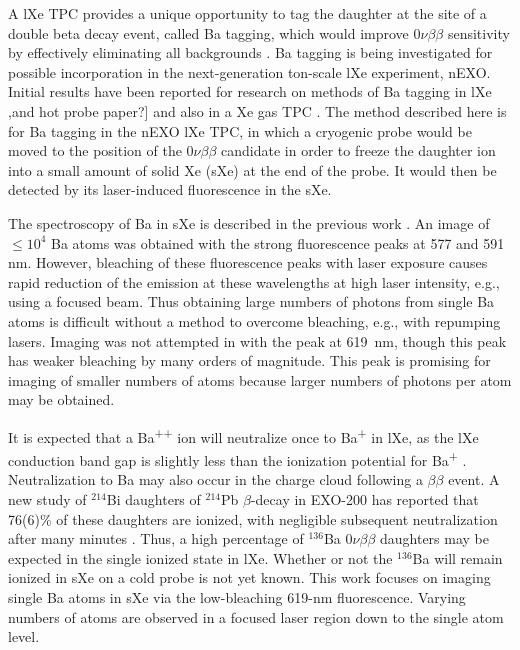 \documentclass[aps,pra,reprint,superscriptaddress]{revtex4-1}
\begin{document}
A lXe TPC provides a unique opportunity to tag the daughter at the site of a double beta decay event, called Ba tagging, which would improve $0\nu\beta\beta$ sensitivity by effectively eliminating all backgrounds \cite{Moe1991}.  Ba tagging is being investigated for possible incorporation in the next-generation ton-scale lXe experiment, nEXO.  Initial results have been reported for research on methods of Ba tagging in lXe \cite{Twelker2014}{\color{gray},and hot probe paper?]} and also in a Xe gas TPC \cite{Brunner2015}.  The method described here is for Ba tagging in the nEXO lXe TPC, in which a cryogenic probe would be moved to the position of the $0\nu\beta\beta$ candidate in order to freeze the daughter ion into a small amount of solid Xe (sXe) at the end of the probe.  It would then be detected by its laser-induced fluorescence in the sXe.

The spectroscopy of Ba in sXe is described in the previous work \cite{Mong2015}.  An image of $\leq 10^4$ Ba atoms was obtained with the strong fluorescence peaks at 577 and 591 nm.  However, bleaching of these fluorescence peaks with laser exposure causes rapid reduction of the emission at these wavelengths at high laser intensity, e.g., using a focused beam.  Thus obtaining large numbers of photons from single Ba atoms is difficult without a method to overcome bleaching, e.g., with repumping lasers.  Imaging was not attempted in \cite{Mong2015} with the peak at 619~nm, though this peak has weaker bleaching by many orders of magnitude.  This peak is promising for imaging of smaller numbers of atoms because larger numbers of photons per atom may be obtained.

It is expected that a Ba\textsuperscript{++} ion will neutralize once to Ba\textsuperscript{+} in lXe, as the lXe conduction band gap is slightly less than the ionization potential for Ba\textsuperscript{+} \cite{Moe1991}.  Neutralization to Ba may also occur in the charge cloud following a $\beta\beta$ event.  A new study of $^{214}$Bi daughters of $^{214}$Pb $\beta$-decay in EXO-200 has reported that 76(6)\% of these daughters are ionized, with negligible subsequent neutralization after many minutes \cite{alphaion}.  Thus, a high percentage of $^{136}$Ba $0\nu\beta\beta$ daughters may be expected in the single ionized state in lXe.  Whether or not the $^{136}$Ba will remain ionized in sXe on a cold probe is not yet known.  This work focuses on imaging single Ba atoms in sXe via the low-bleaching 619-nm fluorescence.  Varying numbers of atoms are observed in a focused laser region down to the single atom level.
\end{document}
